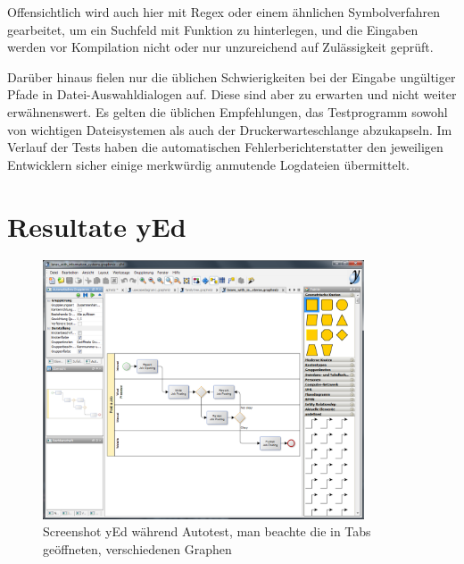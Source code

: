Offensichtlich wird auch hier mit Regex oder einem ähnlichen
Symbolverfahren gearbeitet, um ein Suchfeld mit Funktion zu hinterlegen,
und die Eingaben werden vor Kompilation nicht oder nur unzureichend 
auf Zulässigkeit geprüft.

Darüber hinaus fielen nur die üblichen Schwierigkeiten bei der Eingabe
ungültiger Pfade in Datei-Auswahldialogen auf. Diese sind aber zu erwarten
und nicht weiter erwähnenswert. Es gelten die üblichen Empfehlungen,
das Testprogramm sowohl von wichtigen Dateisystemen als auch
der Druckerwarteschlange abzukapseln. Im Verlauf der Tests haben die
automatischen Fehlerberichterstatter den jeweiligen Entwicklern sicher
einige merkwürdig anmutende Logdateien übermittelt.




\section{Resultate yEd}\label{section:testresultsyed}

\begin{figure}
	\centering
	\includegraphics[width=0.85\textwidth]{bilder/screenshot_yed.png}
	\caption{Screenshot yEd während Autotest, man beachte die in Tabs geöffneten, 
	verschiedenen Graphen}
	\label{fig:screenshot_yed}
\end{figure}

